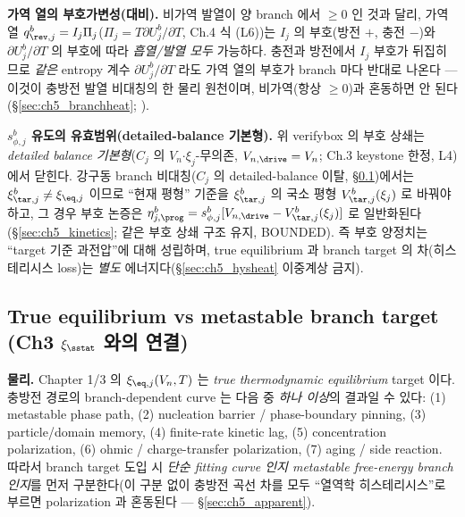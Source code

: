 \textbf{가역 열의 부호가변성(대비).} 비가역 발열이 양 branch 에서 $\ge0$ 인 것과 달리, 가역 열
$q_{\rev,j}^b=I_j\Pi_j$($\Pi_j=T\partial U_j^b/\partial T$, Ch.4 식 (L6))는 $I_j$ 의 부호(방전 $+$, 충전 $-$)와
$\partial U_j^b/\partial T$ 의 부호에 따라 \emph{흡열/발열 모두} 가능하다. 충전과 방전에서 $I_j$ 부호가
뒤집히므로 \emph{같은} entropy 계수 $\partial U_j^b/\partial T$ 라도 가역 열의 부호가 branch 마다 반대로 나온다
— 이것이 충방전 발열 비대칭의 한 물리 원천이며, 비가역(항상 $\ge0$)과 혼동하면 안 된다(\S\ref{sec:ch5_branchheat};
).

\begin{boundbox}
\textbf{$s_{\phi,j}^b$ 유도의 유효범위(detailed-balance 기본형).} 위 verifybox 의 부호 상쇄는 \emph{detailed
balance 기본형}($C_j$ 의 $V_n$$\cdot$$\xi_j$-무의존, $V_{n,\drive}=V_n$; Ch.3 keystone 한정, L4)에서 닫힌다.
강구동 branch 비대칭($C_j$ 의 detailed-balance 이탈, \S\ref{sec:ch5_branch})에서는 $\xi_{\tar,j}^b\ne\xi_{\eq,j}$
이므로 ``현재 평형'' 기준을 $\xi_{\tar,j}^b$ 의 국소 평형 $V_{\tar,j}^b(\xi_j)$ 로 바꿔야 하고, 그 경우 부호
논증은 $\eta_{j,\prog}^b=s_{\phi,j}^b[V_{n,\drive}-V_{\tar,j}^b(\xi_j)]$ 로 일반화된다(\S\ref{sec:ch5_kinetics};
같은 부호 상쇄 구조 유지, BOUNDED). 즉 부호 양정치는 ``target 기준 과전압''에 대해 성립하며, true equilibrium
과 branch target 의 차(히스테리시스 loss)는 \emph{별도} 에너지다(\S\ref{sec:ch5_hysheat} 이중계상 금지).
\end{boundbox}

\subsection{True equilibrium vs metastable branch target (Ch3 $\xi_{\sstat}$ 와의 연결)}\label{sec:ch5_branch}
\textbf{물리.} Chapter 1/3 의 $\xi_{\eq,j}(V_n,T)$ 는 \emph{true thermodynamic equilibrium} target 이다.
충방전 경로의 branch-dependent curve 는 다음 중 \emph{하나 이상}의 결과일 수 있다: (1) metastable phase path,
(2) nucleation barrier / phase-boundary pinning, (3) particle/domain memory, (4) finite-rate kinetic lag,
(5) concentration polarization, (6) ohmic / charge-transfer polarization, (7) aging / side reaction. 따라서
branch target 도입 시 \emph{단순 fitting curve 인지 metastable free-energy branch 인지}를 먼저 구분한다(이
구분 없이 충방전 곡선 차를 모두 ``열역학 히스테리시스''로 부르면 polarization 과 혼동된다 —
\S\ref{sec:ch5_apparent}).

